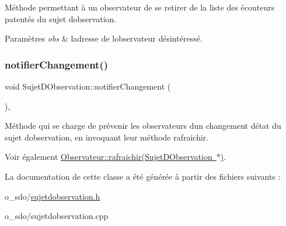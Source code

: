 Méthode permettant à un observateur de se retirer de la liste des écouteurs patentés du sujet d\textquotesingle{}observation. 


\begin{DoxyParams}{Paramètres}
{\em obs} & l\textquotesingle{}adresse de l\textquotesingle{}observateur désintéressé. \\
\hline
\end{DoxyParams}
\mbox{\label{class_sujet_d_observation_ab4a833d911377a2dd3c83ce8ce3ac540}} 
\subsubsection{\texorpdfstring{notifierChangement()}{notifierChangement()}}
{\footnotesize\ttfamily void Sujet\+D\+Observation\+::notifier\+Changement (\begin{DoxyParamCaption}{ }\end{DoxyParamCaption})\hspace{0.3cm}{\ttfamily [protected]}, {\ttfamily [virtual]}}



Méthode qui se charge de prévenir les observateurs d\textquotesingle{}un changement d\textquotesingle{}état du sujet d\textquotesingle{}observation, en invoquant leur méthode rafraichir. 

\begin{DoxySeeAlso}{Voir également}
\mbox{\hyperlink{class_observateur_a4fcbecba73ee923d201246207b8470ce}{Observateur\+::rafraichir(\+Sujet\+D\+Observation $\ast$)}}. 
\end{DoxySeeAlso}


La documentation de cette classe a été générée à partir des fichiers suivants \+:\begin{DoxyCompactItemize}
\item 
o\+\_\+sdo/\mbox{\hyperlink{sujetdobservation_8h}{sujetdobservation.\+h}}\item 
o\+\_\+sdo/sujetdobservation.\+cpp\end{DoxyCompactItemize}
